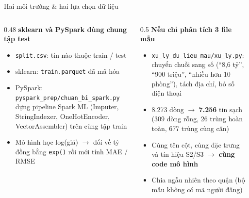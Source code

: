 \documentclass[aspectratio=169,11pt]{beamer}
\newcommand{\num}[1]{{\color{accentdark}\bfseries #1}}
\begin{document}
\begin{frame}{Hai môi trường \& hai lựa chọn dữ liệu}
  \begin{columns}[T]
    \begin{column}{0.48\linewidth}
      \textbf{sklearn và PySpark dùng chung tập test}
      \small
      \begin{itemize}
        \item \texttt{split.csv}: tin nào thuộc train / test
        \item sklearn: \texttt{train.parquet} đã mã hóa
        \item PySpark: \texttt{pyspark\_prep/chuan\_bi\_spark.py} dựng pipeline Spark ML (Imputer, StringIndexer, OneHotEncoder, VectorAssembler) trên cùng tập train
        \item Mô hình học log(giá) $\to$ đổi về tỷ đồng bằng \texttt{exp()} rồi mới tính MAE / RMSE
      \end{itemize}
    \end{column}
    \begin{column}{0.5\linewidth}
      \textbf{Nếu chỉ phân tích 3 file mẫu}
      \small
      \begin{itemize}
        \item \texttt{xu\_ly\_du\_lieu\_mau/xu\_ly.py}: chuyển chuỗi sang số (``8,6 tỷ'', ``900 triệu'', ``nhiều hơn 10 phòng''), tách địa chỉ, bỏ số điện thoại
        \item 8.273 dòng $\to$ \num{7.256} tin sạch (309 dòng rỗng, 26 trùng hoàn toàn, 677 trùng cùng căn)
        \item Cùng tên cột, cùng đặc trưng và tín hiệu S2/S3 $\to$ \textbf{cùng code mô hình}
        \item Chia ngẫu nhiên theo quận (bộ mẫu không có mã người đăng)
      \end{itemize}
    \end{column}
  \end{columns}
\end{frame}
\end{document}
